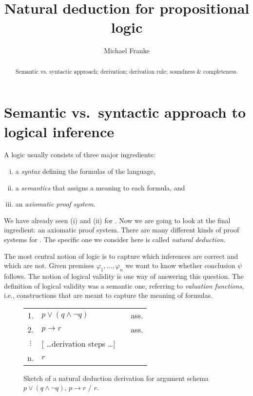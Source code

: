 \documentclass[nobib,nofonts]{tufte-handout}
\title{Natural deduction for propositional logic}
\author[M.~Franke]{Michael Franke}
\date{} %
\newcommand{\mygray}[1]{\textcolor{mygray2}{#1}}
\newcommand{\proplog}{\acro{PropLog}}
\begin{document}
\maketitle

\begin{abstract}
\noindent
Semantic vs. syntactic approach; derivation; derivation rule; soundness \& completeness.
\end{abstract}

\section{Semantic vs.~syntactic approach to logical inference}

A logic usually consists of three major ingredients:
\begin{enumerate}[(i)]
  \item a \emph{syntax} defining the formulas of the language,
  \item a \emph{semantics} that assigns a meaning to each formula, and
  \item an \emph{axiomatic proof system}.
\end{enumerate}
We have already seen (i) and (ii) for \proplog.
Now we are going to look at the final ingredient: an axiomatic proof system.
There are many different kinds of proof systems for \proplog.
The specific one we consider here is called \emph{natural deduction}.

The most central notion of logic is to capture which inferences are correct and which are not.
Given premises $\varphi_{1}, \dots, \varphi_{n}$ we want to know whether conclusion $\psi$ follows.
The notion of logical validity is one way of answering this question.
The definition of logical validity was a semantic one, referring to \emph{valuation functions}, i.e., constructions that are meant to capture the meaning of formulas.

\begin{figure}
  \centering
  \begin{tabular}{clcl}
  1. & $p \vee (q \wedge \neg q)$ & & ass. \\
  2. & $p \rightarrow r$ & & ass. \\
  $\vdots$ & \mygray{[ \dots derivation steps \dots]} & &   \\
  n. & $r$ & &   \\
\end{tabular}
\caption{Sketch of a natural deduction derivation for argument schema $p \vee (q \wedge \neg q)$, $p \rightarrow r$ / $r$.}
\label{fig:deduction-schema}
\end{figure}
\end{document}
